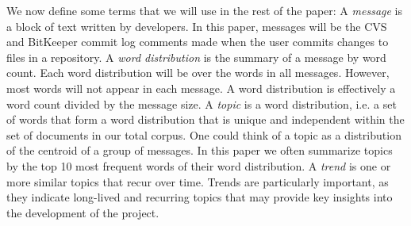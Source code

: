 \documentclass[times, 10pt,twocolumn]{article}
\newcommand{\shrinkit}{\vspace*{-.3em}}
\begin{document}
\shrinkit
{}
\shrinkit


We now define some terms that we will use in the rest of the paper: A
\emph{message} is a block of text written by developers. In this
paper, messages will be the CVS and BitKeeper commit log comments made
when the user commits changes to files in a repository. A \emph{word
  distribution} is the summary of a message by word count. Each word
distribution will be over the words in all messages. However, most
words will not appear in each message. A word distribution is effectively
a word count divided by the message size. A \emph{topic} is a word
distribution, i.e. a set of words that form a word distribution that is
unique and independent within the set of documents in our total
corpus. One could think of a topic as a distribution of the centroid
of a group of messages. In this paper we often summarize topics by the
top 10 most frequent words of their word distribution.  A \emph{trend}
is one or more similar topics that recur over time.  Trends are
particularly important, as they indicate long-lived and recurring
topics that may provide key insights into the development of the
project.
\end{document}
